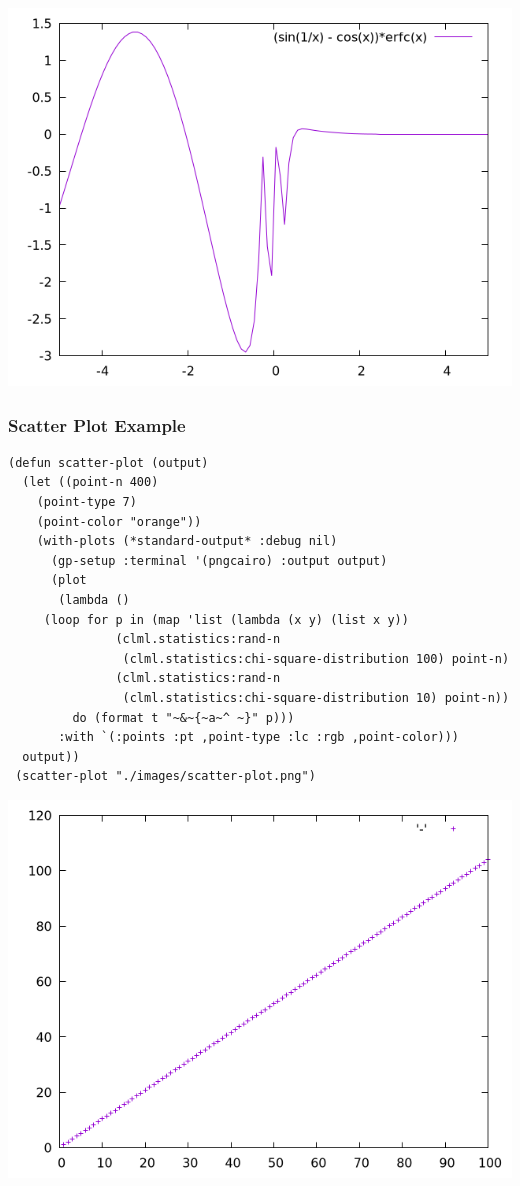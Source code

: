 \documentclass[11pt]{article}
\begin{document}
\begin{center}
\includegraphics[width=.9\linewidth]{./images/function-plot.png}
\end{center}

\subsubsection{Scatter Plot Example}
\label{sec:org82ec54b}
\begin{verbatim}
(defun scatter-plot (output)
  (let ((point-n 400)
	(point-type 7)
	(point-color "orange"))
    (with-plots (*standard-output* :debug nil)
      (gp-setup :terminal '(pngcairo) :output output)
      (plot
       (lambda ()
	 (loop for p in (map 'list (lambda (x y) (list x y))
			   (clml.statistics:rand-n
			    (clml.statistics:chi-square-distribution 100) point-n)
			   (clml.statistics:rand-n
			    (clml.statistics:chi-square-distribution 10) point-n))
	     do (format t "~&~{~a~^ ~}" p)))
       :with `(:points :pt ,point-type :lc :rgb ,point-color)))
  output))
 (scatter-plot "./images/scatter-plot.png")
\end{verbatim}

\begin{center}
\includegraphics[width=.9\linewidth]{./images/scatter-plot.png}
\end{center}
\end{document}
